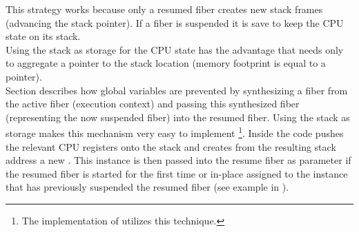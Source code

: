 This strategy works because only a resumed fiber creates new stack frames
(advancing the stack pointer). If a fiber is suspended it is save to keep the
CPU state on its stack.\\

Using the stack as storage for the CPU state has the advantage that \fiber needs
only to aggregate a pointer to the stack location (memory footprint is equal to
a pointer).\\
Section  describes how global variables are prevented
by synthesizing a fiber from the active fiber (execution context) and passing
this synthesized fiber (representing the now suspended fiber) into the resumed
fiber. Using the stack as storage makes this mechanism very easy to implement
\footnote{The implementation of \bcontext\cite{bcontext} utilizes this
technique.}.
Inside \resume the code pushes the relevant CPU registers onto the stack and
creates from the resulting stack address a new \fiber. This instance is then
passed into the resume fiber as parameter if the resumed fiber is started for the
first time or in-place assigned to the \fiber instance  that has previously
suspended the resumed fiber (see example in ).\\

